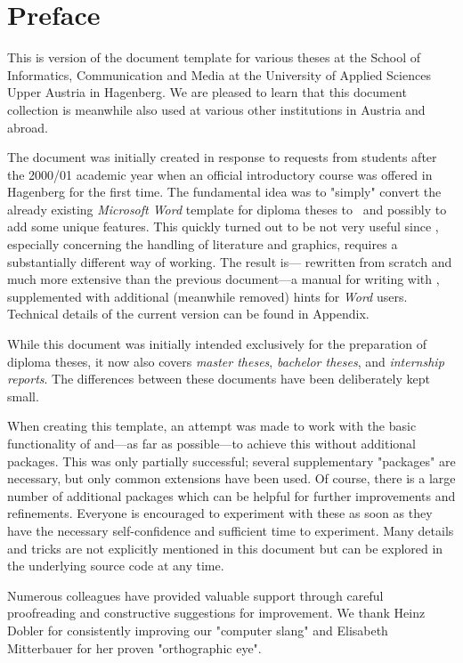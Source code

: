 \chapter{Preface} %

This is version \textbf{\hgbDate} of the \latex document template for various
theses at the School of Informatics, Communication and Media at the University
of Applied Sciences Upper Austria in Hagenberg. We are pleased to learn that this
document collection is meanwhile also used at various other institutions in Austria
and abroad.

The document was initially created in response to requests from students after
the 2000/01 academic year when an official \latex introductory course was
offered in Hagenberg for the first time. The fundamental idea was to
"simply" convert the already existing \emph{Microsoft Word} template for
diploma theses to \latex\ and possibly to add some unique features. This quickly
turned out to be not very useful since \latex, especially concerning the
handling of literature and graphics, requires a substantially different way of
working. The result is--- rewritten from scratch and much more extensive than
the previous document---a manual for writing with \latex, supplemented with
additional (meanwhile removed) hints for \emph{Word} users. Technical details
of the current version can be found in Appendix.

While this document was initially intended exclusively for the preparation
of diploma theses, it now also covers \emph{master theses},
\emph{bachelor theses}, and \emph{internship reports}. The differences between
these documents have been deliberately kept small.


When creating this template, an attempt was made to work with the basic
functionality of \latex and---as far as possible---to achieve this without
additional packages. This was only partially successful; several supplementary
"packages" are necessary, but only common extensions have been used. Of course,
there is a large number of additional packages which can be helpful for further
improvements and refinements. Everyone is encouraged to experiment with these as
soon as they have the necessary self-confidence and sufficient time to
experiment. Many details and tricks are not explicitly mentioned in this
document but can be explored in the underlying source code at any time.

Numerous colleagues have provided valuable support through careful proofreading
and constructive suggestions for improvement. We thank Heinz Dobler for
consistently improving our "computer slang" and Elisabeth Mitterbauer for her
proven "orthographic eye".

